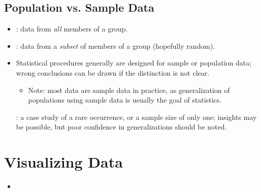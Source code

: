 \begin{itemize}
    \subsection{Population vs. Sample Data}
    \begin{itemize}
      \item {}: data from \emph{all} members of a group.
      \item {}: data from a \emph{subset} of members of a group (hopefully random).
      \item Statistical procedures generally are designed for sample or population data; wrong conclusions can be drawn if the distinction is not clear. 
        \begin{itemize}
          \item Note: most data are sample data in practice, as generalization of populations using sample data is usually the goal of statistics.
        \end{itemize}
      : a case study of a rare occurrence, or a sample size of only one; insights may be possible, but poor confidence in generalizations should be noted.
    \end{itemize}
  
\end{itemize}

\section{Visualizing Data}
\begin{itemize}
  \item 
\end{itemize}


